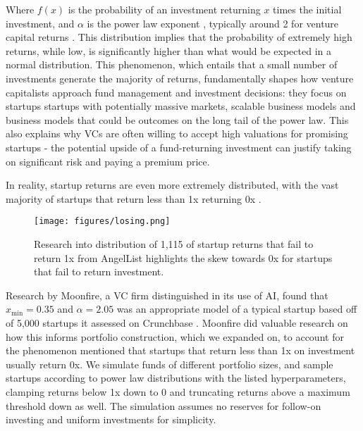 \documentclass[a4paper, oneside]{discothesis}
\begin{document}
Where $f(x)$ is the probability of an investment returning $x$ times the initial investment, and $\alpha$ is the power law exponent \cite{clauset2009power}, typically around 2 for venture capital returns \cite{farina_arpaia_2023_venture_capital_portfolio_construction}. This distribution implies that the probability of extremely high returns, while low, is significantly higher than what would be expected in a normal distribution. This phenomenon, which entails that a small number of investments generate the majority of returns, fundamentally shapes how venture capitalists approach fund management and investment decisions: they focus on startups startups with potentially massive markets, scalable business models and business models that could be outcomes on the long tail of the power law. This also explains why VCs are often willing to accept high valuations for promising startups - the potential upside of a fund-returning investment can justify taking on significant risk and paying a premium price.

In reality, startup returns are even more extremely distributed, with the vast majority of startups that return less than 1x returning 0x \cite{othman2019startup}.
\begin{figure}[htbp]
    \centering
    \texttt{[image: figures/losing.png]}
    \caption{Research into distribution of 1,115 of startup returns that fail to return 1x from AngelList highlights the skew towards 0x for startups that fail to return investment. \cite{othman2022howmuchcanyouloseonafailedstartupinvestment}}
    \label{fig:startup_returns_distribution}
\end{figure}

\pagebreak

Research by Moonfire, a VC firm distinguished in its use of AI, found that $x_{\text{min}} = 0.35$ and $\alpha = 2.05$ was an appropriate model of a typical 
startup based off of 5,000 startups it assessed on Crunchbase \cite{farina_arpaia_2023_venture_capital_portfolio_construction}. Moonfire did valuable research on how this informs portfolio construction, which we expanded on, to account for the phenomenon mentioned that startups that return less than 1x on investment usually return 0x. We simulate funds of different portfolio sizes, and sample startups according to power law distributions with the listed hyperparameters, clamping returns below 1x down to 0 and truncating returns above a maximum threshold down as well. The simulation assumes no reserves for follow-on investing and uniform investments for simplicity.
\end{document}
